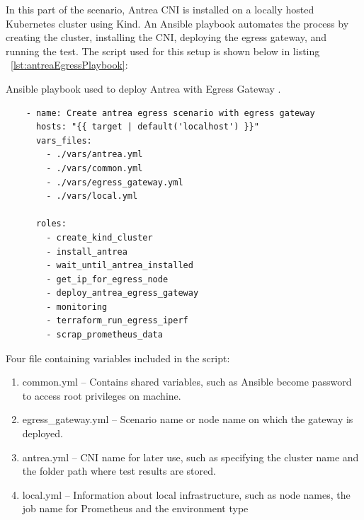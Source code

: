 
In this part of the scenario, Antrea CNI is installed on a locally hosted Kubernetes cluster using Kind. An Ansible playbook automates the process by creating the cluster, installing the CNI, deploying the egress gateway, and running the test. The script used for this setup is shown below in listing ~\ref{lst:antreaEgressPlaybook}:

\begin{listing}[H]
  \centering
  \caption{Ansible playbook used to deploy Antrea with Egress Gateway \cite{AnsiblePlaybook}.}
  \begin{verbatim}
    - name: Create antrea egress scenario with egress gateway
      hosts: "{{ target | default('localhost') }}"
      vars_files:
        - ./vars/antrea.yml
        - ./vars/common.yml
        - ./vars/egress_gateway.yml
        - ./vars/local.yml

      roles:
        - create_kind_cluster
        - install_antrea
        - wait_until_antrea_installed
        - get_ip_for_egress_node
        - deploy_antrea_egress_gateway
        - monitoring
        - terraform_run_egress_iperf
        - scrap_prometheus_data
  \end{verbatim}
  \label{lst:antreaEgressPlaybook}
\end{listing}

Four file containing variables included in the script:
\begin{enumerate}
  \item common.yml -- Contains shared variables, such as Ansible become password to access root privileges on machine.
  \item egress\_gateway.yml -- Scenario name or node name on which the gateway is deployed.
  \item antrea.yml -- CNI name for later use, such as specifying the cluster name and the folder path where test results are stored.
  \item local.yml -- Information about local infrastructure, such as node names, the job name for Prometheus and the environment type
\end{enumerate}

